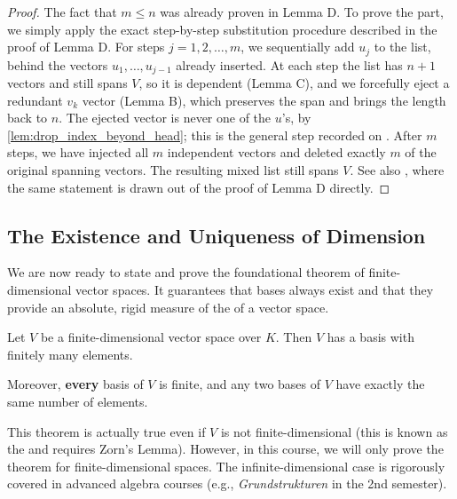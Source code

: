 \begin{proof}
The fact that $m \le n$ was already proven in Lemma D. To prove the  part, we simply apply the exact step-by-step substitution procedure described in the proof of Lemma D. 
For steps $j = 1, 2, \dots, m$, we sequentially add $u_j$ to the list, behind the vectors $u_1, \dots, u_{j-1}$ already inserted. At each step the list has $n+1$ vectors and still spans $V$, so it is dependent (Lemma C), and we forcefully eject a redundant $v_k$ vector (Lemma B), which preserves the span and brings the length back to $n$. The ejected vector is never one of the $u$'s, by \cref{lem:drop_index_beyond_head}; this is the general step recorded on . After $m$ steps, we have injected all $m$ independent vectors and deleted exactly $m$ of the original spanning vectors. The resulting mixed list still spans $V$. See also , where the same statement is drawn out of the proof of Lemma D directly.
\end{proof}

\subsection{The Existence and Uniqueness of Dimension}

We are now ready to state and prove the foundational theorem of finite-di\-men\-sional vector spaces. It guarantees that bases always exist and that they provide an absolute, rigid measure of the  of a vector space.

\begin{theorem}
\label{thm:basis_theorem}
Let $V$ be a finite-di\-men\-sional vector space over $K$. Then $V$ has a basis with finitely many elements. 

Moreover, \textbf{every} basis of $V$ is finite, and any two bases of $V$ have exactly the same number of elements.
\end{theorem}

\begin{remark}
This theorem is actually true even if $V$ is not finite-di\-men\-sional (this is known as the  and requires Zorn's Lemma). However, in this course, we will only prove the theorem for finite-di\-men\-sional spaces. The infinite-di\-men\-sional case is rigorously covered in advanced algebra courses (e.g., \textit{Grundstrukturen} in the 2nd semester).
\end{remark}

